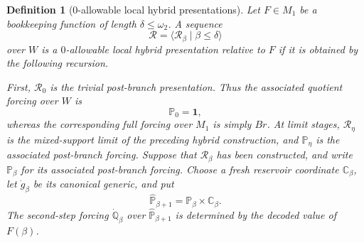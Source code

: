 \documentclass[a4paper,11pt]{article}
\newtheorem{definition}[theorem]{Definition}
\begin{document}
\begin{definition}[\(0\)-allowable local hybrid presentations]
\label{def:zero-local-allowable}
Let \(F\in M_1\) be a bookkeeping function of length
\(\delta\leq\omega_2\).  A sequence
\[
   \mathcal R=\langle \mathcal R_\beta\mid \beta\leq\delta\rangle
\]
over \(W\) is a \emph{\(0\)-allowable local hybrid presentation relative to
\(F\)} if it is obtained by the following recursion.

First, \(\mathcal R_0\) is the trivial post-branch presentation.  Thus the associated quotient forcing over \(W\) is
\[
   \mathbb P_0=\mathbf 1,
\]
whereas the corresponding full forcing over \(M_1\) is simply \(Br\).
At limit stages, \(\mathcal R_\eta\) is the mixed-support limit of the preceding
hybrid construction, and \(\mathbb P_\eta\) is the associated post-branch
forcing.  Suppose that \(\mathcal R_\beta\) has been constructed, and write
\(\mathbb P_\beta\) for its associated post-branch forcing.
Choose a fresh reservoir coordinate \(\mathbb C_\beta\), let
\(\dot g_\beta\) be its canonical generic, and put
\[
   \widehat{\mathbb P}_{\beta+1}
      =
   \mathbb P_\beta\times\mathbb C_\beta.
\]
The second-step forcing \(\dot{\mathbb Q}_\beta\) over
\(\widehat{\mathbb P}_{\beta+1}\) is determined by the decoded value of
\(F(\beta)\).


\end{definition}
\end{document}
